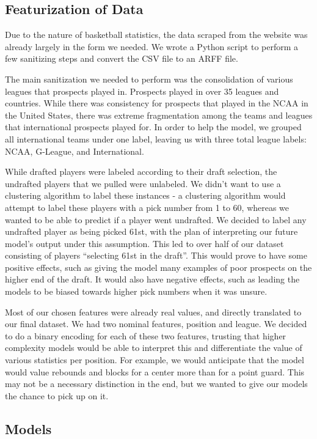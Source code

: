 \documentclass{article}
\begin{document}
\subsection{Featurization of Data}

Due to the nature of basketball statistics, the data scraped from the website
was already largely in the form we needed. We wrote a Python script to perform a
few sanitizing steps and convert the CSV file to an ARFF file.

The main sanitization we needed to perform was the consolidation of various
leagues that prospects played in. Prospects played in over 35 leagues and
countries. While there was consistency for prospects that played in the NCAA in
the United States, there was extreme fragmentation among the teams and leagues
that international prospects played for. In order to help the model, we grouped
all international teams under one label, leaving us with three total league
labels: NCAA, G-League, and International.

While drafted players were labeled according to their draft selection, the
undrafted players that we pulled were unlabeled. We didn’t want to use a
clustering algorithm to label these instances - a clustering algorithm would
attempt to label these players with a pick number from 1 to 60, whereas we
wanted to be able to predict if a player went undrafted. We decided to label any
undrafted player as being picked 61st, with the plan of interpreting our future
model’s output under this assumption. This led to over half of our dataset
consisting of players “selecting 61st in the draft”. This would prove to have
some positive effects, such as giving the model many examples of poor prospects
on the higher end of the draft. It would also have negative effects, such as
leading the models to be biased towards higher pick numbers when it was unsure. 

Most of our chosen features were already real values, and directly translated to
our final dataset. We had two nominal features, position and league. We decided
to do a binary encoding for each of these two features, trusting that higher
complexity models would be able to interpret this and differentiate the value of
various statistics per position. For example, we would anticipate that the model
would value rebounds and blocks for a center more than for a point guard. This
may not be a necessary distinction in the end, but we wanted to give our models
the chance to pick up on it.

\subsection{Models}
\end{document}

